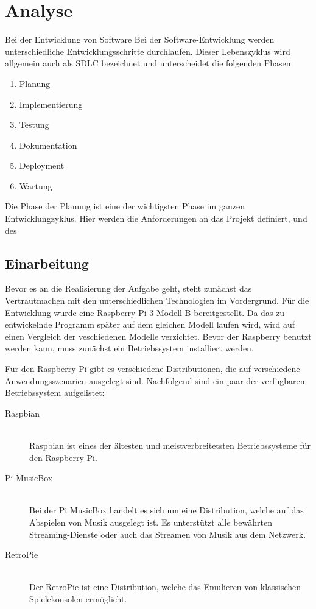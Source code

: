 
\chapter{Analyse}
Bei der Entwicklung von Software 
Bei der Software-Entwicklung werden unterschiedliche Entwicklungsschritte
durchlaufen. Dieser Lebenszyklus wird allgemein auch als \acs{SDLC} bezeichnet
und unterscheidet die folgenden Phasen:
\begin{enumerate}
\item Planung
\item Implementierung
\item Testung
\item Dokumentation
\item Deployment
\item Wartung
\end{enumerate}

Die Phase der Planung ist eine der wichtigsten Phase im ganzen
Entwicklungzyklus. Hier werden die Anforderungen an das Projekt definiert, und des 





\section{Einarbeitung}
Bevor es an die Realisierung der Aufgabe geht, steht zunächst das
Vertrautmachen mit den unterschiedlichen Technologien im Vordergrund. Für die
Entwicklung wurde eine Raspberry Pi 3 Modell B bereitgestellt. Da das zu
entwickelnde Programm später auf dem gleichen Modell laufen wird, wird auf
einen Vergleich der veschiedenen Modelle verzichtet. Bevor der Raspberry
benutzt werden kann, muss zunächst ein Betriebssystem installiert werden.
\hfill \break

Für den Raspberry Pi gibt es verschiedene Distributionen, die auf verschiedene
Anwendungsszenarien ausgelegt sind. Nachfolgend sind ein paar der verfügbaren
Betriebssystem aufgelistet: 
\begin{description}
\item[Raspbian] \hfill \\ 
    Raspbian ist eines der ältesten und meistverbreitetsten Betriebssysteme für
    den Raspberry Pi. 
\item[Pi MusicBox] \hfill \\ 
    Bei der Pi MusicBox handelt es sich um eine Distribution, welche auf das
    Abspielen von Musik ausgelegt ist. Es unterstützt alle bewährten
    Streaming-Dienste oder auch das Streamen von Musik aus dem Netzwerk.
\item[RetroPie] \hfill \\
    Der RetroPie ist eine Distribution, welche das Emulieren von klassischen
    Spielekonsolen ermöglicht.
\end{description}

